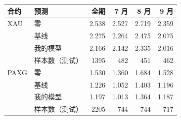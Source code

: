 \begin{tabular}{llrrrr}
\toprule
合约 & 预测 & 全期 & 7 月 & 8 月 & 9 月 \\
\midrule
XAU & 零 & 2.538 & 2.527 & 2.719 & 2.359 \\
 & 基线 & 2.275 & 2.264 & 2.475 & 2.075 \\
 & 我的模型 & 2.166 & 2.142 & 2.335 & 2.016 \\
 & 样本数（测试） & 1395 & 482 & 451 & 462 \\
\midrule
PAXG & 零 & 1.530 & 1.360 & 1.684 & 1.528 \\
 & 基线 & 1.226 & 1.052 & 1.403 & 1.196 \\
 & 我的模型 & 1.197 & 1.013 & 1.364 & 1.187 \\
 & 样本数（测试） & 2205 & 744 & 744 & 717 \\
\bottomrule
\end{tabular}
